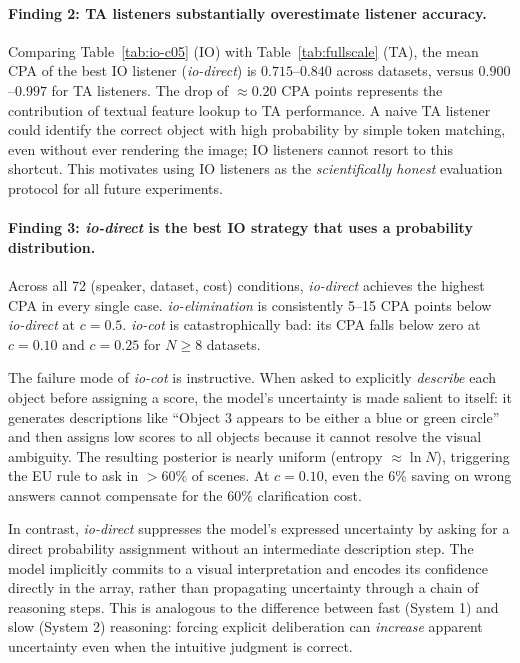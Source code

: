\documentclass[11pt]{article}
\begin{document}
\paragraph{Finding 2: TA listeners substantially overestimate listener accuracy.}
Comparing Table~\ref{tab:io-c05} (IO) with Table~\ref{tab:fullscale} (TA),
the mean CPA of the best IO listener (\textit{io-direct}) is
$0.715$--$0.840$ across datasets, versus $0.900$--$0.997$ for TA listeners.
The drop of $\approx 0.20$ CPA points represents the contribution of textual
feature lookup to TA performance.
A naive TA listener could identify the correct object with high probability
by simple token matching, even without ever rendering the image; IO listeners
cannot resort to this shortcut.
This motivates using IO listeners as the \emph{scientifically honest} evaluation
protocol for all future experiments.

\paragraph{Finding 3: \textit{io-direct} is the best IO strategy that uses a probability distribution.}
Across all 72 (speaker, dataset, cost) conditions, \textit{io-direct} achieves
the highest CPA in every single case.
\textit{io-elimination} is consistently 5--15 CPA points below \textit{io-direct}
at $c{=}0.5$.
\textit{io-cot} is catastrophically bad: its CPA falls below zero at $c{=}0.10$
and $c{=}0.25$ for $N \geq 8$ datasets.

The failure mode of \textit{io-cot} is instructive.  When asked to explicitly
\emph{describe} each object before assigning a score, the model's uncertainty is
made salient to itself: it generates descriptions like ``Object 3 appears to be
either a blue or green circle'' and then assigns low scores to all objects because
it cannot resolve the visual ambiguity.  The resulting posterior is nearly uniform
(entropy $\approx \ln N$), triggering the EU rule to ask in $>60\%$ of scenes.
At $c{=}0.10$, even the 6\% saving on wrong answers cannot compensate for the
60\% clarification cost.

In contrast, \textit{io-direct} suppresses the model's expressed uncertainty by
asking for a direct probability assignment without an intermediate description
step.  The model implicitly commits to a visual interpretation and encodes its
confidence directly in the array, rather than propagating uncertainty through a
chain of reasoning steps.
This is analogous to the difference between fast (System 1) and slow (System 2)
reasoning: forcing explicit deliberation can \emph{increase} apparent uncertainty
even when the intuitive judgment is correct.
\end{document}
